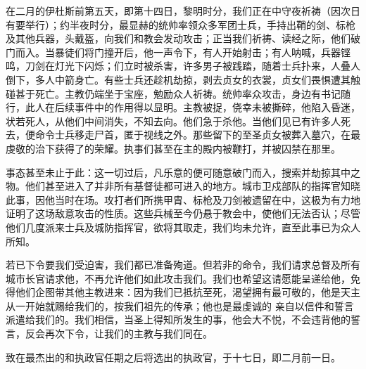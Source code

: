 在二月的伊杜斯前第五天，即第十四日，黎明时分，我们正在中守夜祈祷（因次日有要举行）；约半夜时分，最显赫的统帅率领众多军团士兵，手持出鞘的剑、标枪及其他兵器，头戴盔，向我们和教会发动攻击；正当我们祈祷、读经之际，他们破门而入。当暴徒们将门撞开后，他一声令下，有人开始射击；有人呐喊，兵器铿鸣，刀剑在灯光下闪烁；们立时被杀害，许多男子被践踏，随着士兵扑来，人叠人倒下，多人中箭身亡。有些士兵还趁机劫掠，剥去贞女的衣裳，贞女们畏惧遭其触碰甚于死亡。主教仍端坐于宝座，勉励众人祈祷。统帅率众攻击，身边有书记随行，此人在后续事件中的作用得以显明。主教被捉，侥幸未被撕碎，他陷入昏迷，状若死人，从他们中间消失，不知去向。他们急于杀他。当他们见已有许多人死去，便命令士兵移走尸首，匿于视线之外。那些留下的至圣贞女被葬入墓穴，在最虔敬的治下获得了的荣耀。执事们甚至在主的殿内被鞭打，并被囚禁在那里。\par

事态甚至未止于此：这一切过后，凡乐意的便可随意破门而入，搜索并劫掠其中之物。他们甚至进入了并非所有基督徒都可进入的地方。城市卫戍部队的指挥官知晓此事，因他当时在场。攻打者们所携甲胄、标枪及刀剑被遗留在中，这极为有力地证明了这场敌意攻击的性质。这些兵械至今仍悬于教会中，使他们无法否认；尽管他们几度派来士兵及城防指挥官，欲将其取走，我们均未允许，直至此事已为众人所知。\par

若已下令要我们受迫害，我们都已准备殉道。但若非的命令，我们请求总督及所有城市长官请求他，不再允许他们如此攻击我们。我们也希望这请愿能呈递给他，免得他们企图带其他主教进来：因为我们已抵抗至死，渴望拥有最可敬的，他是天主从一开始就赐给我们的，按我们祖先的传承；他也是最虔诚的 亲自以信件和誓言派遣给我们的。我们相信，当圣上得知所发生的事，他会大不悦，不会违背他的誓言，反会再次下令，让我们的主教与我们同在。\par

致在最杰出的和执政官任期之后将选出的执政官，于十七日，即二月前一日。\par

